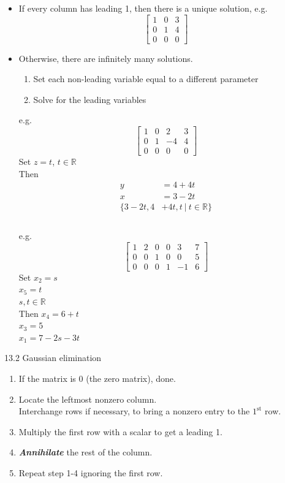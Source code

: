 \documentclass[]{article}
\begin{document}
		\begin{itemize}
			\item If every column has leading 1, then there is a unique solution, e.g.
			$$
				\left[
					\begin{array}{cc|c}
						{1}&{0}&{3}\\
						{0}&{1}&{4}\\
						{0}&{0}&{0}
					\end{array}
				\right]
			$$
			\item Otherwise, there are infinitely many solutions.
			\begin{enumerate}
				\item Set each non-leading variable equal to a different parameter
				\item Solve for the leading variables
			\end{enumerate}
			e.g.
			$$
				\left[
					\begin{array}{ccc|c}
					{1}&{0}&{2}&{3}\\
					{0}&{1}&{-4}&{4}\\
					{0}&{0}&{0}&{0}
					\end{array}
				\right]
			$$
			Set $z=t$, $t\in\mathbb{R}$\\
			Then
			\begin{align*}
				y&=4+4t\\
				x&=3-2t\\
				\{3-2t,4&+4t,t~|~t\in\mathbb{R}\}\\
			\end{align*}
			\pagebreak\\
			e.g.
			$$
				\left[
					\begin{array}{ccccc|c}
						{1}&{2}&{0}&{0}&{3}&{7}\\
						{0}&{0}&{1}&{0}&{0}&{5}\\
						{0}&{0}&{0}&{1}&{-1}&{6}
					\end{array}
				\right]
			$$
			Set $x_2=s$\\
			$x_5=t$\\
			$s,t\in\mathbb{R}$\\
			Then $x_4=6+t$\\
			$x_3=5$\\
			$x_1=7-2s-3t$
		\end{itemize}
		\large {13.2 Gaussian elimination}\\
		\normalsize
		\begin{enumerate}
			\item If the matrix is $0$ (the zero matrix), done.
			\item Locate the leftmost nonzero column.\\
			Interchange rows if necessary, to bring a nonzero entry to the $1^{\text{st}}$ row.
			\item Multiply the first row with a scalar to get a leading 1.
			\item {\bf \emph{Annihilate}} the rest of the column.
			\item Repeat step 1-4 ignoring the first row.
		\end{enumerate}
\end{document}
